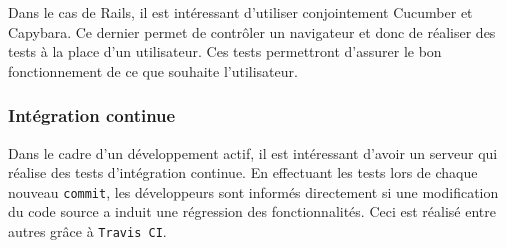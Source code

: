 Dans le cas de Rails, il est intéressant d'utiliser conjointement Cucumber et Capybara. Ce dernier permet de contrôler un navigateur et donc de réaliser des tests à la place d'un utilisateur. Ces tests permettront d'assurer le bon fonctionnement de ce que souhaite l'utilisateur.

\subsubsection{Intégration continue}
\label{travis}
Dans le cadre d'un développement actif, il est intéressant d'avoir un serveur qui réalise des tests d'intégration continue. En effectuant les tests lors de chaque nouveau \texttt{commit}, les développeurs sont informés directement si une modification du code source a induit une régression des fonctionnalités. Ceci est réalisé entre autres grâce à \texttt{Travis CI}.
